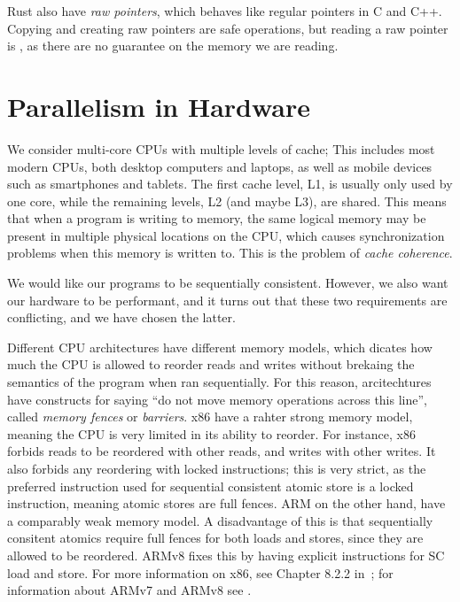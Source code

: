 \documentclass[b5paper,twoside]{report}
\begin{document}
Rust also have \emph{raw pointers}, which behaves like regular pointers in C
and C++.  Copying and creating raw pointers are safe operations, but reading a
raw pointer is , as there are no guarantee on the memory we are
reading.






\section{Parallelism in Hardware}
   We consider multi-core CPUs with multiple levels of cache;
This includes most modern CPUs, both desktop computers and laptops, as well as
mobile devices such as smartphones and tablets.  The first cache level, L1, is
usually only used by one core, while the remaining levels, L2 (and maybe L3),
are shared.  This means that when a program is writing to memory, the same
logical memory may be present in multiple physical locations on the CPU, which
causes synchronization problems when this memory is written to. This is the
problem of \emph{cache coherence}.

We would like our programs to be sequentially consistent.  However, we also
want our hardware to be performant, and it turns out that these two
requirements are conflicting, and we have chosen the latter.


 Different CPU architectures have different memory models, which
dicates how much the CPU is allowed to reorder reads and writes without
brekaing the semantics of the program when ran sequentially.  For this reason,
arcitechtures have constructs for saying ``do not move memory operations across
this line'', called \emph{memory fences} or \emph{barriers}.  x86 have a rahter
strong memory model, meaning the CPU is very limited in its ability to reorder.
For instance, x86 forbids reads to be reordered with other reads, and writes
with other writes. It also forbids any reordering with locked instructions;
this is very strict, as the preferred instruction used for sequential
consistent atomic store is a locked instruction, meaning atomic stores are full
fences.  ARM on the other hand, have a comparably weak memory model. A
disadvantage of this is that sequentially consitent atomics require full fences
for both loads and stores, since they are allowed to be reordered.  ARMv8 fixes
this by having explicit instructions for SC load and store.  For more
information on x86, see Chapter 8.2.2 in~\cite{intel64}; for information about
ARMv7 and ARMv8 see .
\end{document}
